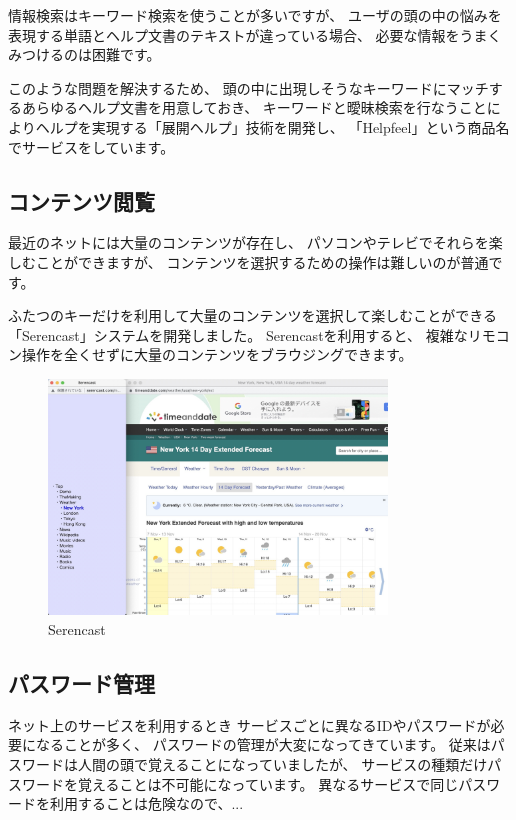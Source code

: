 \documentclass[topics]{compsoft} %
\begin{document}
情報検索はキーワード検索を使うことが多いですが、
ユーザの頭の中の悩みを表現する単語とヘルプ文書のテキストが違っている場合、
必要な情報をうまくみつけるのは困難です。

このような問題を解決するため、
頭の中に出現しそうなキーワードにマッチするあらゆるヘルプ文書を用意しておき、
キーワードと曖昧検索を行なうことによりヘルプを実現する「展開ヘルプ」\cite{xxx}技術を開発し、
「Helpfeel」という商品名でサービスをしています。

\subsection{コンテンツ閲覧}

最近のネットには大量のコンテンツが存在し、
パソコンやテレビでそれらを楽しむことができますが、
コンテンツを選択するための操作は難しいのが普通です。

ふたつのキーだけを利用して大量のコンテンツを選択して楽しむことができる
「Serencast」システムを開発しました\cite{seren}。
Serencastを利用すると、
複雑なリモコン操作を全くせずに大量のコンテンツをブラウジングできます。

\begin{figure}[t]
  \includegraphics[width=9cm,bb=0 0 2510 1746]{figures/bb4027e2e210bc16450f0120a2987458.jpg}
  \caption{Serencast}
  \label{example1}
\end{figure}

\subsection{パスワード管理}

ネット上のサービスを利用するとき
サービスごとに異なるIDやパスワードが必要になることが多く、
パスワードの管理が大変になってきています。
従来はパスワードは人間の頭で覚えることになっていましたが、
サービスの種類だけパスワードを覚えることは不可能になっています。
異なるサービスで同じパスワードを利用することは危険なので、...
\end{document}
